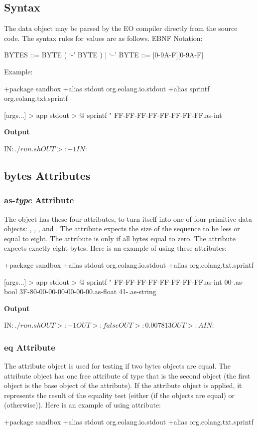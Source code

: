 \documentclass[12pt]{book}
\begin{document}
{\subsection{Syntax}
The  data object may be parsed by the EO compiler directly from the source code. The syntax rules for  values are as follows.
EBNF Notation:
\begin{ffcode}
    BYTES   ::= BYTE ( ‘-’ BYTE ) | ‘--’
    BYTE    ::= [0-9A-F][0-9A-F]
\end{ffcode}
Example:
\begin{ffcode}
+package sandbox
+alias stdout org.eolang.io.stdout
+alias sprintf org.eolang.txt.sprintf

[args...] > app
  stdout > @
    sprintf
      "%
      FF-FF-FF-FF-FF-FF-FF-FF.as-int
\end{ffcode}
\textbf{Output}
\begin{ffcode}
IN$: ./run.sh
OUT>: -1
IN$:
\end{ffcode}

\subsection{bytes Attributes}

\subsubsection{as-\textit{type} Attribute}
The object  has these four attributes, to turn itself into one of four primitive data objects: , , , and .
The attribute  expects the size of the sequence to be less or equal to eight. The attribute  is  only if all bytes equal to zero. The attribute  expects exactly eight bytes.
Here is an example of using these attributes:
\begin{ffcode}
+package sandbox
+alias stdout org.eolang.io.stdout
+alias org.eolang.txt.sprintf

[args...] > app
  stdout > @
    sprintf
      "%
      FF-FF-FF-FF-FF-FF-FF-FF.as-int
      00-.as-bool
      3F-80-00-00-00-00-00-00.as-float
      41-.as-string
\end{ffcode}
\textbf{Output}
\begin{ffcode}
IN$: ./run.sh
OUT>: -1
OUT>: false
OUT>: 0.007813
OUT>: A
IN$:
\end{ffcode}

\subsubsection{eq Attribute}
The  attribute object is used for testing if two bytes objects are equal. The  attribute object has one free attribute of type  that is the second object (the first object is the base object of the  attribute).
If the  attribute object is applied, it represents the result of the equality test (either  (if the objects are equal) or  (otherwise)).
Here is an example of using  attribute:
\begin{ffcode}
+package sandbox
+alias stdout org.eolang.io.stdout
+alias org.eolang.txt.sprintf


\end{ffcode}}
\end{document}
